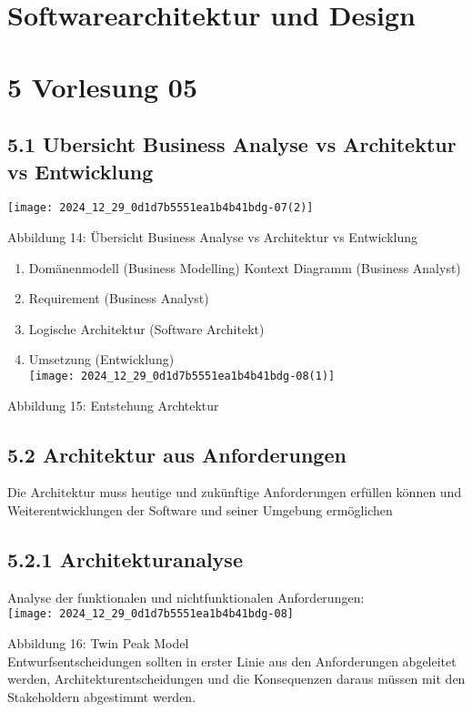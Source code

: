 \section{Softwarearchitektur und Design}

\section*{5 Vorlesung 05}
\subsection*{5.1 Ubersicht Business Analyse vs Architektur vs Entwicklung}
\begin{center}
\texttt{[image: 2024\_12\_29\_0d1d7b5551ea1b4b41bdg-07(2)]}
\end{center}

Abbildung 14: Übersicht Business Analyse vs Architektur vs Entwicklung

\begin{enumerate}
  \item Domänenmodell (Business Modelling) Kontext Diagramm (Business Analyst)
  \item Requirement (Business Analyst)
  \item Logische Architektur (Software Architekt)
  \item Umsetzung (Entwicklung)\\
\texttt{[image: 2024\_12\_29\_0d1d7b5551ea1b4b41bdg-08(1)]}
\end{enumerate}

Abbildung 15: Entstehung Archtektur

\subsection*{5.2 Architektur aus Anforderungen}
Die Architektur muss heutige und zukünftige Anforderungen erfüllen können und Weiterentwicklungen der Software und seiner Umgebung ermöglichen

\subsection*{5.2.1 Architekturanalyse}
Analyse der funktionalen und nichtfunktionalen Anforderungen:\\
\texttt{[image: 2024\_12\_29\_0d1d7b5551ea1b4b41bdg-08]}

Abbildung 16: Twin Peak Model\\
Entwurfsentscheidungen sollten in erster Linie aus den Anforderungen abgeleitet werden, Architekturentscheidungen und die Konsequenzen daraus müssen mit den Stakeholdern abgestimmt werden.


